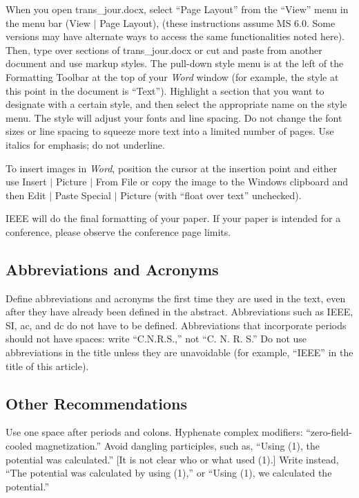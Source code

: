 \documentclass[journal]{IEEEtai}
\begin{document}
When you open trans\_jour.docx, select ``Page Layout'' from the ``View'' menu in the menu bar (View $|$ Page Layout), (these instructions assume MS 6.0. Some versions may have alternate ways to access the same functionalities noted here). Then, type over sections of trans\_jour.docx or cut and paste from another document and use markup styles. The pull-down style menu is at the left of the Formatting Toolbar at the top of your {\it Word} window (for example, the style at this point in the document is ``Text''). Highlight a section that you want to designate with a certain style, and then select the appropriate name on the style menu. The style will adjust your fonts and line spacing. Do not change the font sizes or line spacing to squeeze more text into a limited number of pages. Use italics for emphasis; do not underline.

To insert images in {\it Word}, position the cursor at the insertion point and either use Insert $|$ Picture $|$ From File or copy the image to the Windows clipboard and then Edit $|$ Paste Special $|$ Picture (with ``float over text'' unchecked). 

IEEE will do the final formatting of your paper. If your paper is intended for a conference, please observe the conference page limits.

\subsection{Abbreviations and Acronyms}

Define abbreviations and acronyms the first time they are used in the text, even after they have already been defined in the abstract. Abbreviations such as IEEE, SI, ac, and dc do not have to be defined. Abbreviations that incorporate periods should not have spaces: write ``C.N.R.S.,'' not ``C. N. R. S.'' Do not use abbreviations in the title unless they are unavoidable (for example, ``IEEE'' in the title of this article).

\subsection{Other Recommendations}

Use one space after periods and colons. Hyphenate complex modifiers: ``zero-field-cooled magnetization.'' Avoid dangling participles, such as, ``Using (1), the potential was calculated.'' [It is not clear who or what used (1).] Write instead, ``The potential was calculated by using (1),'' or ``Using (1), we calculated the potential.''
\end{document}

